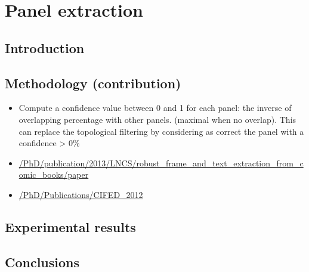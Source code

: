 \chapter{Panel extraction}
\label{chap:pe}
\graphicspath{{./chapters/4-pe/figs/}}

\section{Introduction}
\label{sec:pe:introduction}

\section{Methodology (contribution)}
\label{sec:pe:methodology}

\begin{itemize}
	\item Compute a confidence value between 0 and 1 for each panel: the inverse of overlapping percentage with other panels. (maximal when no overlap). This can replace the topological filtering by considering as correct the panel with a confidence > 0\%
	\item \url{/PhD/publication/2013/LNCS/robust_frame_and_text_extraction_from_comic_books/paper}
	\item \url{/PhD/Publications/CIFED_2012}
\end{itemize}

\section{Experimental results}
\label{sec:pe:experimental_results}


\section{Conclusions}
\label{sec:pe:conclusion}
